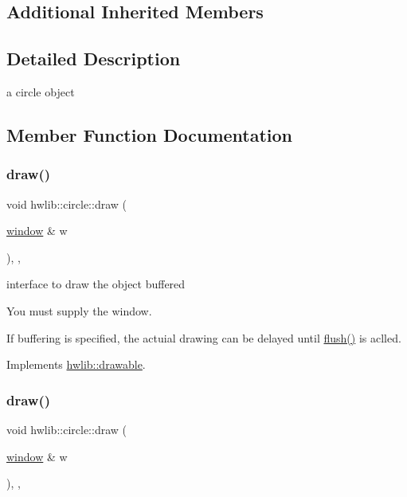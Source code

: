 \subsection*{Additional Inherited Members}


\subsection{Detailed Description}
a circle object 

\subsection{Member Function Documentation}
\mbox{\label{classhwlib_1_1circle_a7a4d6bbd0692b757eee4615a8c5ea9f4}} 
\subsubsection{\texorpdfstring{draw()}{draw()}\hspace{0.1cm}{\footnotesize\ttfamily [1/2]}}
{\footnotesize\ttfamily void hwlib\+::circle\+::draw (\begin{DoxyParamCaption}\item[{\hyperlink{classhwlib_1_1window}{window} \&}]{w }\end{DoxyParamCaption})\hspace{0.3cm}{\ttfamily [inline]}, {\ttfamily [override]}, {\ttfamily [virtual]}}



interface to draw the object buffered 

You must supply the window.

If buffering is specified, the actuial drawing can be delayed until \hyperlink{namespacehwlib_a648fe94ca9899747a632c23f97007732}{flush()} is aclled. 

Implements \hyperlink{classhwlib_1_1drawable_ac9ea0de52a14d9024cb34110f794ac28}{hwlib\+::drawable}.

\mbox{\label{classhwlib_1_1circle_a7a4d6bbd0692b757eee4615a8c5ea9f4}} 
\subsubsection{\texorpdfstring{draw()}{draw()}\hspace{0.1cm}{\footnotesize\ttfamily [2/2]}}
{\footnotesize\ttfamily void hwlib\+::circle\+::draw (\begin{DoxyParamCaption}\item[{\hyperlink{classhwlib_1_1window}{window} \&}]{w }\end{DoxyParamCaption})\hspace{0.3cm}{\ttfamily [inline]}, {\ttfamily [override]}, {\ttfamily [virtual]}}



